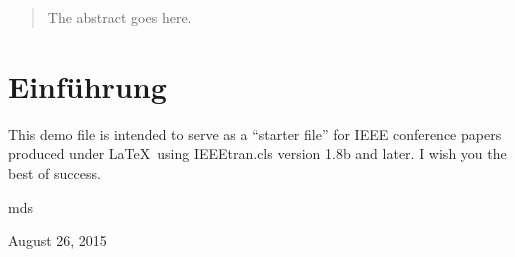 \documentclass[conference]{IEEEtran}
\begin{document}
\maketitle

\begin{abstract}
The abstract goes here.
\end{abstract}





%
\IEEEpeerreviewmaketitle



\section{Einführung}
This demo file is intended to serve as a ``starter file''
for IEEE conference papers produced under \LaTeX\ using
IEEEtran.cls version 1.8b and later.
I wish you the best of success.

\hfill mds
 
\hfill August 26, 2015

%
%
\end{document}
